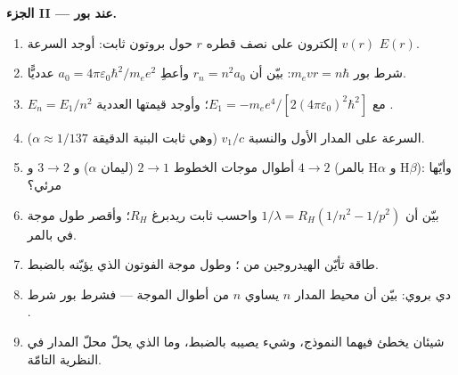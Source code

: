 \begin{problem}
\medskip
\noindent\textbf{الجزء II ---  عند بور.}
\begin{enumerate}[resume]
  \item إلكترون على  نصف قطره $r$ حول بروتون
        ثابت: أوجد السرعة $v(r)$  $E(r)$.
  \item شرط بور $m_evr = n\hbar$: بيّن أن $r_n = n^2a_0$ وأعطِ
        $a_0 = 4\pi\varepsilon_0\hbar^2/m_ee^2$ عدديًّا.
  \item $E_n = E_1/n^2$ مع $E_1 = -m_ee^4/[2(4\pi\varepsilon_0)^2\hbar^2]$؛
        وأوجد قيمتها العددية .
  \item السرعة على المدار الأول والنسبة $v_1/c$ (وهي
        ثابت البنية الدقيقة $\alpha \approx 1/137$).
  \item أطوال موجات الخطوط $2 \to 1$ (ليمان $\alpha$) و $3 \to 2$ و
        $4 \to 2$ (بالمر H$\alpha$ و H$\beta$): وأيّها مرئي؟
  \item بيّن أن $1/\lambda = R_H(1/n^2 - 1/p^2)$ واحسب ثابت
        ريدبرغ $R_H$؛ وأقصر طول موجة في بالمر.
  \item طاقة تأيّن الهيدروجين من ؛ وطول موجة
        الفوتون الذي يؤيّنه بالضبط.
  \item دي بروي: بيّن أن محيط المدار $n$ يساوي $n$ من
        أطوال الموجة --- فشرط بور شرط .
  \item شيئان يخطئ فيهما النموذج، وشيء يصيبه بالضبط،
        وما الذي يحلّ محلّ المدار في النظرية التامّة.
\end{enumerate}


\end{problem}
